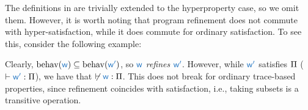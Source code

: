 The definitions in  are trivially extended to the hyperproperty case, so we omit them.
However, it is worth noting that program refinement does not commute with hyper-satisfaction, while it does commute for ordinary satisfaction.
To see this, consider the following example:
\begin{center}
\end{center}

Clearly, $\operatorname{behav}(\src{\wholeprogvar})\subseteq\operatorname{behav}(\src{\wholeprogvar'})$, so $\src{\wholeprogvar}$ {\em refines} $\src{\wholeprogvar'}$.
However, while $\src{\wholeprogvar[']}$ satisfies $\Pi$ ($\sat{\src{\wholeprogvar[']}}{\varHProp}$), we have that $\not\sat{\src{\wholeprogvar}}{\varHProp}$.
This does not break for ordinary trace-based properties, since refinement coincides with satisfaction, i.e., taking subsets is a transitive operation.



